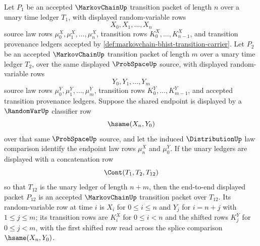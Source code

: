 
\begin{theorem}
\label{thm:markovchain-transition-packet-concatenation-closure}
Let $P_1$ be an accepted $\MarkovChainUp$ transition packet of length $n$ over a unary time ledger $T_1$, with displayed random-variable rows
$$
X_0,X_1,\ldots,X_n
$$
source law rows $\mu^X_0,\mu^X_1,\ldots,\mu^X_n$, transition rows $K^X_0,\ldots,K^X_{n-1}$, and transition provenance ledgers accepted by \autoref{def:markovchain-bhist-transition-carrier}. Let $P_2$ be an accepted $\MarkovChainUp$ transition packet of length $m$ over a unary time ledger $T_2$, over the same displayed $\ProbSpaceUp$ source, with displayed random-variable rows
$$
Y_0,Y_1,\ldots,Y_m
$$
source law rows $\mu^Y_0,\mu^Y_1,\ldots,\mu^Y_m$, transition rows $K^Y_0,\ldots,K^Y_{m-1}$, and accepted transition provenance ledgers. Suppose the shared endpoint is displayed by a $\RandomVarUp$ classifier row
$$
\hsame(X_n,Y_0)
$$
over that same $\ProbSpaceUp$ source, and let the induced $\DistributionUp$ law comparison identify the endpoint law rows $\mu^X_n$ and $\mu^Y_0$. If the unary ledgers are displayed with a concatenation row
$$
\Cont(T_1,T_2,T_{12})
$$
so that $T_{12}$ is the unary ledger of length $n+m$, then the end-to-end displayed packet $P_{12}$ is an accepted $\MarkovChainUp$ transition packet over $T_{12}$. Its random-variable row at time $i$ is $X_i$ for $0\leq i\leq n$ and $Y_j$ for $i=n+j$ with $1\leq j\leq m$; its transition rows are $K^X_i$ for $0\leq i<n$ and the shifted rows $K^Y_j$ for $0\leq j<m$, with the first shifted row read across the splice comparison $\hsame(X_n,Y_0)$.
\end{theorem}
